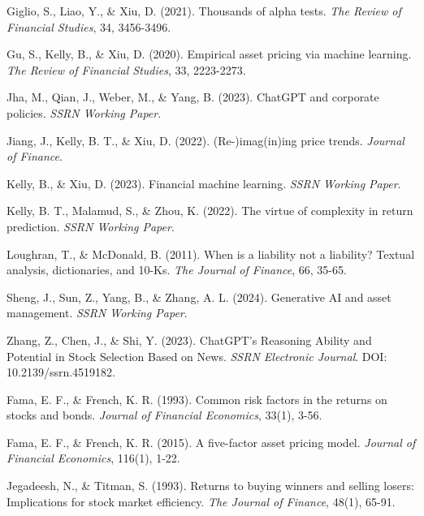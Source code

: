 \documentclass[a4paper,12pt]{article}
\begin{document}
\begin{thebibliography}{99}
Giglio, S., Liao, Y., \& Xiu, D. (2021). Thousands of alpha tests. \textit{The Review of Financial Studies}, 34, 3456-3496.

Gu, S., Kelly, B., \& Xiu, D. (2020). Empirical asset pricing via machine learning. \textit{The Review of Financial Studies}, 33, 2223-2273.

Jha, M., Qian, J., Weber, M., \& Yang, B. (2023). ChatGPT and corporate policies. \textit{SSRN Working Paper}.

Jiang, J., Kelly, B. T., \& Xiu, D. (2022). (Re-)imag(in)ing price trends. \textit{Journal of Finance}.

Kelly, B., \& Xiu, D. (2023). Financial machine learning. \textit{SSRN Working Paper}.

Kelly, B. T., Malamud, S., \& Zhou, K. (2022). The virtue of complexity in return prediction. \textit{SSRN Working Paper}.

Loughran, T., \& McDonald, B. (2011). When is a liability not a liability? Textual analysis, dictionaries, and 10-Ks. \textit{The Journal of Finance}, 66, 35-65.

Sheng, J., Sun, Z., Yang, B., \& Zhang, A. L. (2024). Generative AI and asset management. \textit{SSRN Working Paper}.

Zhang, Z., Chen, J., \& Shi, Y. (2023). ChatGPT's Reasoning Ability and Potential in Stock Selection Based on News. \textit{SSRN Electronic Journal}. DOI: 10.2139/ssrn.4519182.

Fama, E. F., \& French, K. R. (1993). Common risk factors in the returns on stocks and bonds. \textit{Journal of Financial Economics}, 33(1), 3-56.

Fama, E. F., \& French, K. R. (2015). A five-factor asset pricing model. \textit{Journal of Financial Economics}, 116(1), 1-22.

Jegadeesh, N., \& Titman, S. (1993). Returns to buying winners and selling losers: Implications for stock market efficiency. \textit{The Journal of Finance}, 48(1), 65-91.

\end{thebibliography}
\end{document}
